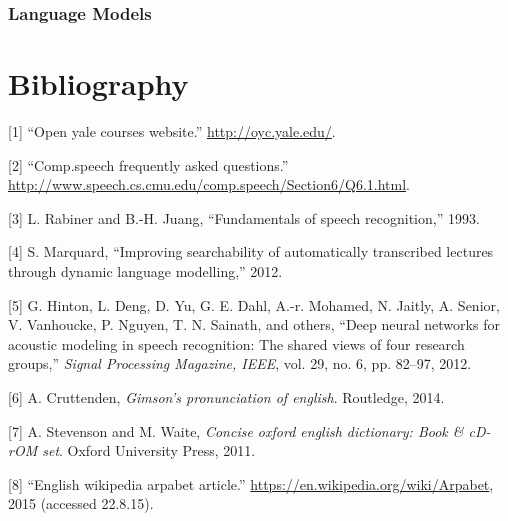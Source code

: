 \documentclass[]{article}
\begin{document}
\subsubsection{Language Models}\label{language-models}

\newpage

\section*{Bibliography}\label{bibliography}

{[}1{]} ``Open yale courses website.'' \url{http://oyc.yale.edu/}.

{[}2{]} ``Comp.speech frequently asked questions.''
\url{http://www.speech.cs.cmu.edu/comp.speech/Section6/Q6.1.html}.

{[}3{]} L. Rabiner and B.-H. Juang, ``Fundamentals of speech
recognition,'' 1993.

{[}4{]} S. Marquard, ``Improving searchability of automatically
transcribed lectures through dynamic language modelling,'' 2012.

{[}5{]} G. Hinton, L. Deng, D. Yu, G. E. Dahl, A.-r. Mohamed, N. Jaitly,
A. Senior, V. Vanhoucke, P. Nguyen, T. N. Sainath, and others, ``Deep
neural networks for acoustic modeling in speech recognition: The shared
views of four research groups,'' \emph{Signal Processing Magazine,
IEEE}, vol. 29, no. 6, pp. 82--97, 2012.

{[}6{]} A. Cruttenden, \emph{Gimson's pronunciation of english}.
Routledge, 2014.

{[}7{]} A. Stevenson and M. Waite, \emph{Concise oxford english
dictionary: Book \& cD-rOM set}. Oxford University Press, 2011.

{[}8{]} ``English wikipedia arpabet article.''
\url{https://en.wikipedia.org/wiki/Arpabet}, 2015 (accessed 22.8.15).
\end{document}
